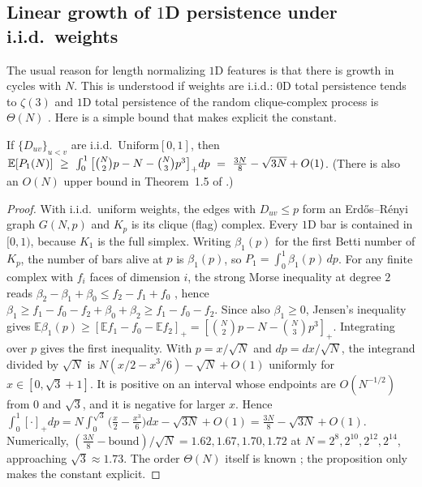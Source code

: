 \subsection{Linear growth of $1$D persistence under i.i.d.\ weights}
The usual reason for length normalizing $1$D features is that there is growth in cycles with $N$. This is understood if weights are i.i.d.: $0$D total persistence tends to $\zeta(3)$ \citep{frieze1985mst} and $1$D total persistence of the random clique-complex process is $\Theta(N)$ \citep{hiraoka2017msa,hino2019lifetime}. Here is a simple bound that makes explicit the constant.

\begin{proposition}
\label{prop:morse}
If $\{D_{uv}\}_{u<v}$ are i.i.d.\ $\mathrm{Uniform}[0,1]$, then
$\mathbb{E}[P_1(N)]\ \ge\ \int_0^1\big[\tbinom N2p-N-\tbinom N3p^3\big]_+dp\ =\ \tfrac{3N}{8}-\sqrt{3N}+O(1)$. (There is also an $O(N)$ upper bound in Theorem~1.5 of \citealp{hino2019lifetime}.)
\end{proposition}
\begin{proof}
With i.i.d.\ uniform weights, the edges with $D_{uv}\le p$ form an Erd\H{o}s--R\'enyi graph $G(N,p)$ and $K_p$ is its clique (flag) complex. Every $1$D bar is contained in $[0,1)$, because $K_1$ is the full simplex. Writing $\beta_1(p)$ for the first Betti number of $K_p$, the number of bars alive at $p$ is $\beta_1(p)$, so $P_1=\int_0^1\beta_1(p)\,dp$.
For any finite complex with $f_i$ faces of dimension $i$, the strong Morse inequality at degree $2$ reads $\beta_2-\beta_1+\beta_0\le f_2-f_1+f_0$ \citep{edelsbrunner2010}, hence $\beta_1\ge f_1-f_0-f_2+\beta_0+\beta_2\ge f_1-f_0-f_2$. Since also $\beta_1\ge0$, Jensen's inequality gives $\mathbb{E}\beta_1(p)\ge[\mathbb{E}f_1-f_0-\mathbb{E}f_2]_+=[\binom N2p-N-\binom N3p^3]_+$. Integrating over $p$ gives the first inequality. With $p=x/\sqrt N$ and $dp=dx/\sqrt N$, the integrand divided by $\sqrt N$ is $N(x/2-x^3/6)-\sqrt N+O(1)$ uniformly for $x\in[0,\sqrt3+1]$. It is positive on an interval whose endpoints are $O(N^{-1/2})$ from $0$ and $\sqrt3$, and it is negative for larger $x$. Hence
$\int_0^1[\cdot]_+dp=N\int_0^{\sqrt3}\big(\tfrac x2-\tfrac{x^3}{6}\big)dx-\sqrt{3N}+O(1)=\tfrac{3N}{8}-\sqrt{3N}+O(1).$
Numerically, $(\tfrac{3N}{8}-\text{bound})/\sqrt N=1.62,1.67,1.70,1.72$ at $N=2^8,2^{10},2^{12},2^{14}$, approaching $\sqrt3\approx1.73$. The order $\Theta(N)$ itself is known \citep{hiraoka2017msa,hino2019lifetime}; the proposition only makes the constant explicit.
\end{proof}
\MorseNumbersText

